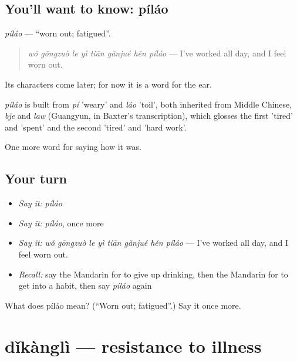 \subsection*{You'll want to know: píláo}
\emph{píláo} — \textquotedblleft{}worn out; fatigued\textquotedblright{}.

\begin{quote}
\emph{wǒ gōngzuò le yì tiān gǎnjué hěn píláo} — I've worked all day, and I feel worn out.
\end{quote}

Its characters come later; for now it is a word for the ear.

\begin{cousinweb}
\emph{píláo} is built from \emph{pí} 'weary' and \emph{láo} 'toil', both inherited from Middle Chinese, \emph{bje} and \emph{law} (Guangyun, in Baxter's transcription), which glosses the first 'tired' and 'spent' and the second 'tired' and 'hard work'.
\end{cousinweb}

\begin{grammarlens}[title={What you've built}]
One more word for saying how it was.
\end{grammarlens}

\subsection*{Your turn}
\begin{itemize}
\raggedright
  \item \emph{Say it:} \emph{píláo}
  \item \emph{Say it:} \emph{píláo}, once more
  \item \emph{Say it:} \emph{wǒ gōngzuò le yì tiān gǎnjué hěn píláo} — I've worked all day, and I feel worn out.
  \item \emph{Recall:} say the Mandarin for to give up drinking, then the Mandarin for to get into a habit, then say \emph{píláo} again
\end{itemize}

\begin{tcolorbox}[breakable,colback=teal!4,colframe=teal!35!black,title={Before you move on}]
What does píláo mean? (\textquotedblleft{}Worn out; fatigued\textquotedblright{}.) Say it once more.
\end{tcolorbox}
\section[dǐkànglì]{dǐkànglì — resistance to illness}


